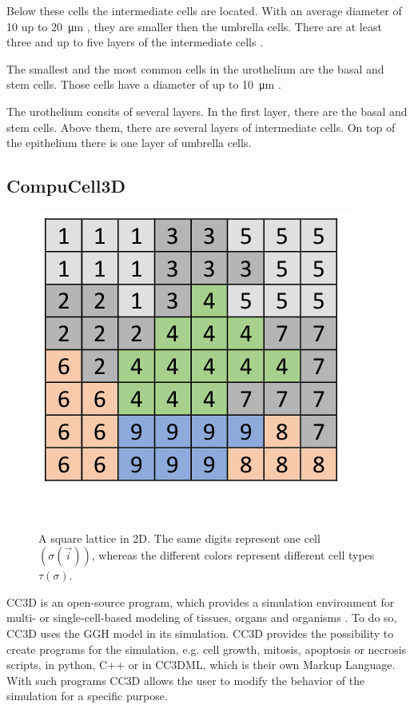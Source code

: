 Below these cells the intermediate cells are located. With an average diameter of 10 up to \SI{20}{\micro\metre} \cite{Yamany2014, PuneetKhandelwal2009}, they are smaller then the umbrella cells. There are at least three and up to five layers of the intermediate cells \cite{REF}. 

The smallest and the most common cells in the urothelium are the basal and stem cells. Those cells have a diameter of up to \SI{10}{\micro\metre} \cite{Lazzeri2006, PuneetKhandelwal2009}. 

The urothelium consits of several layers. In the first layer, there are the basal and stem cells. Above them, there are several layers of intermediate cells. On top of the epithelium there is one layer of umbrella cells.


\subsection{CompuCell3D}
\begin{figure}
	\center
	\includegraphics[scale=0.4]{figures/2DSquareLattice.png}
	\caption{A square lattice in 2D. The same digits represent one cell $(\sigma(\vec{i}))$, whereas the different colors represent different cell types $\tau(\sigma)$.}
	\label{img:2DSquareLattice}
\end{figure}
\ac{CC3D} is an open-source program, which provides a simulation environment for multi- or single-cell-based modeling of tissues, organs and organisms \cite{CC3D.org}. To do so, \ac{CC3D} uses the \ac{GGH} model in its simulation. 
CC3D provides the possibility to create programs for the simulation, e.g. cell growth, mitosis, apoptosis or necrosis scripts, in python, C++ or in CC3DML, which is their own Markup Language. With such programs CC3D allows the user to modify the behavior of the simulation for a specific purpose.
